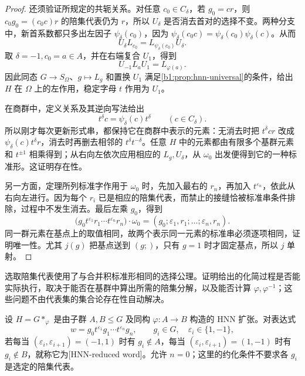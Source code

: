 \begin{proof}
	还须验证所规定的共轭关系。对任意 \(c_0\in C_\delta\)，若 \(g_0=cr\)，则 \(c_0g_0=(c_0c)r\) 的陪集代表仍为 \(r\)，所以 \(U_\delta\) 是否消去首对的选择不变。两种分支中，新首系数都只多出左因子 \(\psi_\delta(c_0)\)，因为 \(\psi_\delta(c_0c)=\psi_\delta(c_0)\psi_\delta(c)\)。从而
	\[
		U_\delta L_{c_0}=L_{\psi_\delta(c_0)}U_\delta.
	\]
	取 \(\delta=-1,c_0=a\in A\)，并在右端复合 \(U_1\)，得到
	\[
		U_{-1}L_aU_1=L_{\varphi(a)}.
	\]
	因此同态 \(G\rightarrow S_\Omega\)、\(g\mapsto L_g\) 和置换 \(U_1\) 满足\cref{b1:prop:hnn-universal}的条件，给出 \(H\) 在 \(\Omega\) 上的左作用，稳定字母 \(t\) 作用为 \(U_1\)。

	在商群中，定义关系及其逆向写法给出
	\[
		t^\delta c=\psi_\delta(c)t^\delta\qquad(c\in C_\delta).
	\]
	所以刚才每次更新形式串，都保持它在商群中表示的元素：无消去时把 \(t^\delta cr\) 改成 \(\psi_\delta(c)t^\delta r\)，消去时再删去相邻的 \(t^\delta t^{-\delta}\)。任意 \(H\) 中的元素都由有限多个基群元素和 \(t^{\pm1}\) 相乘得到；从右向左依次应用相应的 \(L_g,U_\delta\)，从 \(\omega_0\) 出发便得到它的一种标准形。这证明存在性。

	另一方面，定理所列标准字作用于 \(\omega_0\) 时，先加入最右的 \(r_n\)，再加入 \(t^{\varepsilon_n}\)，依此从右向左进行。因为每个 \(r_i\) 已是相应的陪集代表，而禁止的接缝恰被标准串条件排除，过程中不发生消去。最后左乘 \(g_0\)，得到
	\[
		\bigl(g_0t^{\varepsilon_1}r_1\cdots t^{\varepsilon_n}r_n\bigr)\cdot\omega_0
		=(g_0;\varepsilon_1,r_1;\ldots;\varepsilon_n,r_n).
	\]
	同一群元素在基点上的取值相同，故两个表示同一元素的标准串必须逐项相同，证明唯一性。尤其 \(j(g)\) 把基点送到 \((g;)\)，只有 \(g=1\) 时才固定基点，所以 \(j\) 单射。
\end{proof}

选取陪集代表使用了与合并积标准形相同的选择公理。证明给出的化简过程是否能实际执行，取决于能否在基群中算出所需的陪集分解，以及能否计算 \(\varphi,\varphi^{-1}\)；这些问题不由代表集的集合论存在性自动解决。

\begin{definition}\label{b1:def:hnn-reduced-word}
	设 \(H=G*_{\varphi}\) 是由子群 \(A,B\le G\) 及同构 \(\varphi:A\rightarrow B\) 构造的 HNN 扩张。对表达式
	\[
		w=g_0t^{\varepsilon_1}g_1\cdots t^{\varepsilon_n}g_n,
		\qquad g_i\in G,\quad\varepsilon_i\in\{1,-1\},
	\]
	若每当 \((\varepsilon_i,\varepsilon_{i+1})=(-1,1)\) 时有 \(g_i\notin A\)，每当 \((\varepsilon_i,\varepsilon_{i+1})=(1,-1)\) 时有 \(g_i\notin B\)，就称它为[HNN-reduced word]。允许 \(n=0\)；这里的约化条件不要求各 \(g_i\) 是选定的陪集代表。
\end{definition}

